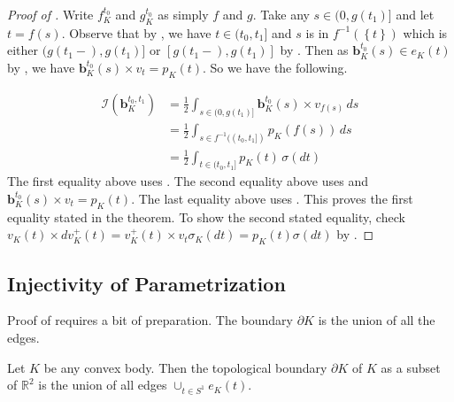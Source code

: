 \begin{proof}[Proof of ]
Write \(f_K^{t_0}\) and \(g_K^{t_0}\) as simply \(f\) and \(g\). Take any \(s \in (0, g(t_1)]\) and let \(t = f(s)\). Observe that by , we have \(t \in (t_0, t_1]\) and \(s\) is in \(f^{-1}(\left\{ t \right\})\) which is either \((g(t_1 -), g(t_1)]\) or \([g(t_1 -), g(t_1)]\) by . Then as \(\mathbf{b}_{K}^{t_0} (s) \in e_K(t)\) by , we have \(\mathbf{b}_{K}^{t_0} (s) \times v_{t} = p_K(t)\). So we have the following.

\begin{align*}
\mathcal{I} \left( \mathbf{b}_{K}^{t_0, t_1} \right) & = \frac{1}{2} \int_{s \in (0, g(t_1)]} \mathbf{b}_{K}^{t_0} (s) \times v_{f(s)} \, ds \\
& = \frac{1}{2} \int_{s \in f^{-1}((t_0, t_1])} p_K(f(s)) \, ds \\
& = \frac{1}{2} \int_{t \in(t_0, t_1]} p_K(t) \, \sigma(dt)
\end{align*}
The first equality above uses . The second equality above uses  and \(\mathbf{b}_{K}^{t_0} (s) \times v_{t} = p_K(t)\). The last equality above uses . This proves the first equality stated in the theorem. To show the second stated equality, check \(v_K(t) \times dv_K^+(t) = v_K^+(t) \times v_{t} \sigma_K(dt) = p_K(t) \sigma(dt)\) by .
\end{proof}

\subsection{Injectivity of Parametrization}

Proof of  requires a bit of preparation. The boundary \(\partial K\) is the union of all the edges.

\begin{theorem}

Let \(K\) be any convex body. Then the topological boundary \(\partial K\) of \(K\) as a subset of \(\mathbb{R}^2\) is the union of all edges \(\cup_{t \in S^1} e_K(t)\).

\label{thm:boundary-is-union-all-edges}
\end{theorem}


